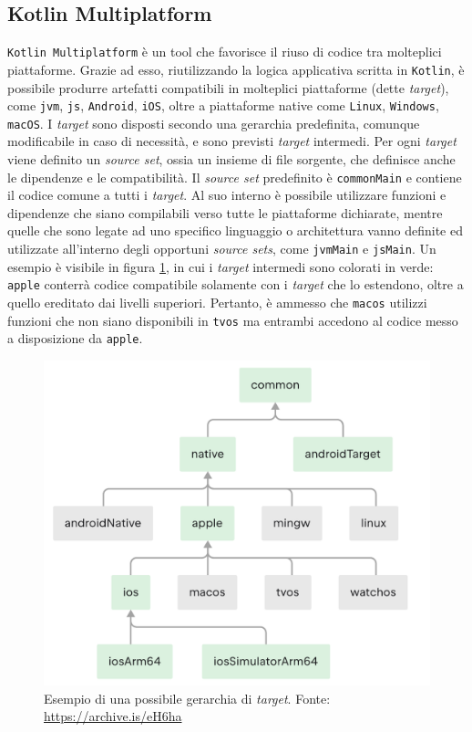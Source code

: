 \documentclass[12pt,a4paper,openright,twoside]{book}
\begin{document}
\subsection{Kotlin Multiplatform}
\texttt{Kotlin Multiplatform} è un tool che favorisce il riuso di codice tra molteplici piattaforme.
Grazie ad esso, riutilizzando la logica applicativa scritta in \texttt{Kotlin}, è possibile produrre artefatti compatibili
in molteplici piattaforme (dette \textit{target}), come \texttt{\ac{jvm}}, \texttt{\ac{js}}, \texttt{Android}, \texttt{iOS}, oltre a piattaforme native come \texttt{Linux}, \texttt{Windows}, \texttt{macOS}.
I \textit{target} sono disposti secondo una gerarchia predefinita, comunque modificabile in caso di necessità, e sono previsti \textit{target} intermedi.
Per ogni \textit{target} viene definito un \textit{source set}, ossia un insieme di file sorgente, che definisce anche le dipendenze e le compatibilità.
Il \textit{source set} predefinito è \texttt{commonMain} e contiene il codice comune a tutti i \textit{target}.
Al suo interno è possibile utilizzare funzioni e dipendenze che siano compilabili verso tutte le piattaforme dichiarate, mentre quelle che
sono legate ad uno specifico linguaggio o architettura vanno definite ed utilizzate all'interno degli opportuni \textit{source sets},
come \texttt{jvmMain} e \texttt{jsMain}. 
Un esempio è visibile in figura \ref{fig:targets}, in cui i \textit{target} intermedi sono colorati in verde: \texttt{apple} conterrà
codice compatibile solamente con i \textit{target} che lo estendono, oltre a quello ereditato dai livelli superiori. Pertanto, è ammesso 
che \texttt{macos} utilizzi funzioni che non siano disponibili in \texttt{tvos} ma entrambi accedono al codice messo a disposizione da \texttt{apple}.
\begin{figure}
    \centering
     \includegraphics[width=1\linewidth]{figures/mptargets.pdf}
     \caption{Esempio di una possibile gerarchia di \textit{target}. Fonte: \url{https://archive.is/eH6ha}}
    \label{fig:targets}
 \end{figure}
\end{document}

